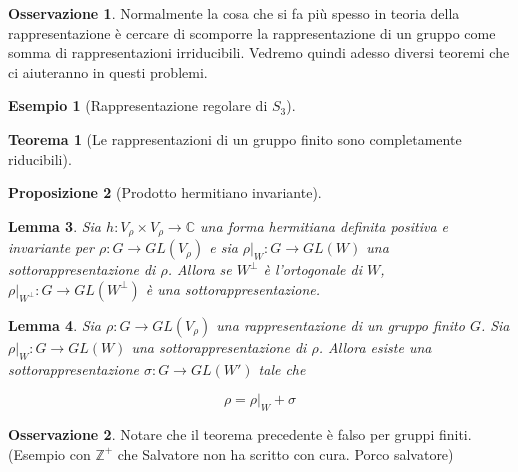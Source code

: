 \documentclass[11pt]{article}
\theoremstyle{plain}
\newtheorem{thm}{Teorema}[section]
\newtheorem{lemma}[thm]{Lemma}
\newtheorem{prop}[thm]{Proposizione}
\theoremstyle{definition}
\newtheorem{exmp}{Esempio}[section]
\newtheorem*{rem}{Osservazione}
\theoremstyle{remark}
\newcommand{\C}{\mathbb{C}}
\begin{document}
\begin{rem} Normalmente la cosa che si fa più spesso in teoria della rappresentazione è cercare di scomporre la rappresentazione di un gruppo come somma di rappresentazioni irriducibili. Vedremo quindi adesso diversi teoremi che ci aiuteranno in questi problemi.

\end{rem}



\begin{exmp}[Rappresentazione regolare di $S_3$]


\end{exmp}



\begin{thm}[Le rappresentazioni di un gruppo finito sono completamente riducibili]

\end{thm}

\begin{prop}[Prodotto hermitiano invariante]

\end{prop}


\begin{lemma}
Sia $h: V_\rho \times V_\rho \to \C$ una forma hermitiana definita positiva e invariante per $\rho: G \to GL(V_\rho)$ e sia $\rho|_W: G \to GL(W)$ una sottorappresentazione di $\rho$. Allora se $W^\perp$ è l'ortogonale di $W$, $\rho|_{W^\perp}: G \to GL(W^\perp)$ è una sottorappresentazione.




\end{lemma}






\begin{lemma}
Sia $\rho: G \to GL(V_\rho)$ una rappresentazione di un gruppo finito $G$. Sia $\rho|_W: G \to GL(W)$ una sottorappresentazione di $\rho$. Allora esiste una sottorappresentazione $\sigma: G \to GL(W')$ tale che

\[\rho = \rho|_W + \sigma \]
\end{lemma}






\begin{rem} Notare che il teorema precedente è falso per gruppi finiti. (Esempio con $\mathbb{Z}^+$ che Salvatore non ha scritto con cura. Porco salvatore)



\end{rem}
\end{document}
